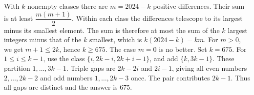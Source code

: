 With $k$ nonempty classes there are $m=2024-k$ positive differences. Their sum is at least $\dfrac{m(m+1)}{2}$. Within each class the differences telescope to its largest minus its smallest element. The sum is therefore at most the sum of the $k$ largest integers minus that of the $k$ smallest, which is $k(2024-k)=km$. For $m>0$, we get $m+1\le2k$, hence $k\ge675$. The case $m=0$ is no better.
Set $k=675$. For $1\le i\le k-1$, use the class $\{i,2k-i,2k+i-1\}$, and add $\{k,3k-1\}$. These partition $1,\ldots,3k-1$. Triple gaps are $2k-2i$ and $2i-1$, giving all even numbers $2,\ldots,2k-2$ and odd numbers $1,\ldots,2k-3$ once. The pair contributes $2k-1$. Thus all gaps are distinct and the answer is $\boxed{675}$.

